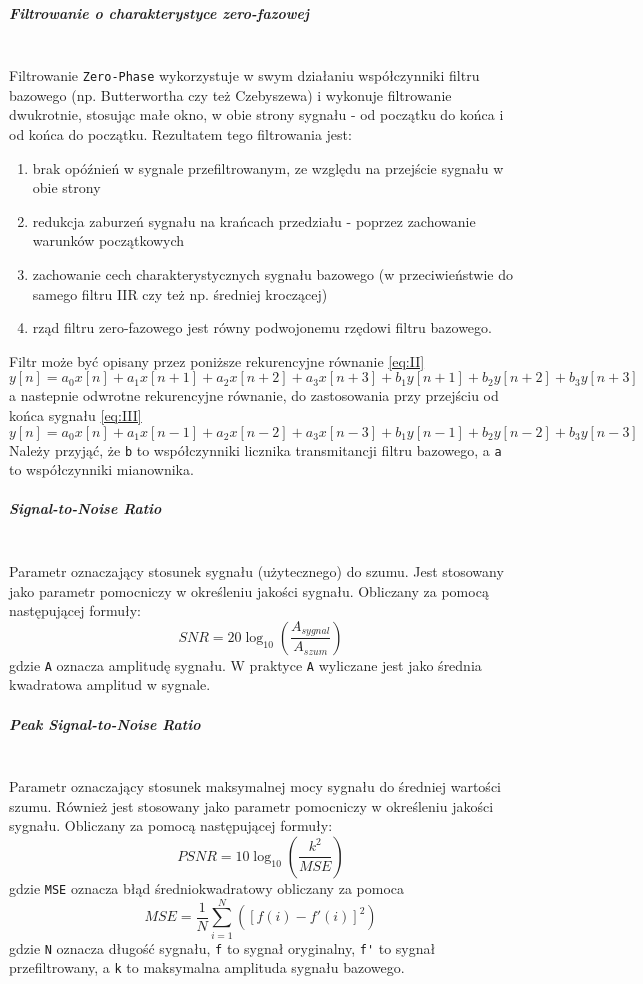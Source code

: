 \documentclass[a4paper, 11pt]{article}
\begin{document}
\subparagraph{Filtrowanie o charakterystyce zero-fazowej}
\mbox{} \\
Filtrowanie \verb|Zero-Phase| wykorzystuje w swym działaniu współczynniki filtru bazowego (np. Butterwortha czy też Czebyszewa) i wykonuje filtrowanie dwukrotnie, stosując małe okno, w obie strony sygnału - od początku do końca i od końca do początku. Rezultatem tego filtrowania jest:
\begin{enumerate}
\item brak opóźnień w sygnale przefiltrowanym, ze względu na przejście sygnału w obie strony
\item redukcja zaburzeń sygnału na krańcach przedziału - poprzez zachowanie warunków początkowych
\item zachowanie cech charakterystycznych sygnału bazowego (w przeciwieństwie do samego filtru IIR czy też np. średniej kroczącej)
\item rząd filtru zero-fazowego jest równy podwojonemu rzędowi filtru bazowego.
\end{enumerate}
Filtr może być opisany przez poniższe rekurencyjne równanie \eqref{eq:II}
\begin{equation}
y[n] = a_{0}x[n]+a_{1}x[n+1]+a_{2}x[n+2]+a_{3}x[n+3]+b_{1}y[n+1]+b_{2}y[n+2]+b_{3}y[n+3] \label{eq:II}
\end{equation}
a nastepnie odwrotne rekurencyjne równanie, do zastosowania przy przejściu od końca sygnału \eqref{eq:III}
\begin{equation}
y[n] = a_{0}x[n]+a_{1}x[n-1]+a_{2}x[n-2]+a_{3}x[n-3]+b_{1}y[n-1]+b_{2}y[n-2]+b_{3}y[n-3] \label{eq:III}
\end{equation}
Należy przyjąć, że \verb|b| to współczynniki licznika transmitancji filtru bazowego, a \verb|a| to współczynniki mianownika.

\subparagraph{Signal-to-Noise Ratio}
\mbox{} \\
Parametr oznaczający stosunek sygnału (użytecznego) do szumu. Jest stosowany jako parametr pomocniczy w określeniu jakości sygnału. Obliczany za pomocą następującej formuły:
\begin{equation}
SNR= 20\log_{10}(\frac{A_{sygnal}}{A_{szum}}) \label{eq:IV}
\end{equation}
gdzie \verb|A| oznacza amplitudę sygnału. W praktyce \verb|A| wyliczane jest jako średnia kwadratowa amplitud w sygnale.

\subparagraph{Peak Signal-to-Noise Ratio}
\mbox{} \\
Parametr oznaczający stosunek maksymalnej mocy sygnału do średniej wartości szumu. Również jest stosowany jako parametr pomocniczy w określeniu jakości sygnału. Obliczany za pomocą następującej formuły:
\begin{equation}
PSNR= 10\log_{10}(\frac{k^2}{MSE}) \label{eq:V}
\end{equation}
gdzie \verb|MSE| oznacza błąd średniokwadratowy obliczany za pomoca
\begin{equation}
MSE=\frac{1}{N}\sum\limits_{i=1}^N([f(i)-f'(i)]^2)\label{eq:VI}
\end{equation}
gdzie \verb|N| oznacza długość sygnału, \verb|f| to sygnał oryginalny, \verb|f'| to sygnał przefiltrowany, a \verb|k| to maksymalna amplituda sygnału bazowego.
\end{document}
